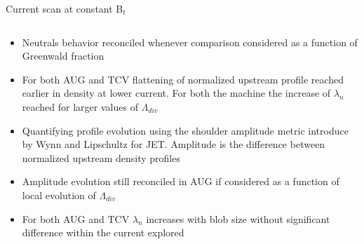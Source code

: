 \documentclass[10pt, compress]{beamer}
\begin{document}
\begin{frame}{Current scan at constant B$_t$}
\begin{columns}
\begin{column}{0.4\textwidth}
\begin{itemize}
          from D$_{\alpha}$ calibrated camera and using electron
          density and temperature from LP data. Neutral density
          increases earlier in edge density at lower current
        \item<5|only@5> Neutrals behavior reconciled whenever
          comparison considered as a function of Greenwald fraction  
        \item<6|only@6> For both AUG and TCV flattening of normalized
          upstream profile reached \alert{earlier in density at lower
            current.} For both the machine the increase of $\lambda_n$
          reached for larger values of $\Lambda_{div}$
        \item<7|only@7> Quantifying profile evolution using the
          \alert{shoulder amplitude metric} introduce by Wynn and
          Lipschultz for JET. \alert{Amplitude is the difference
            between normalized upstream density profiles}
        \item<10|only@10> Amplitude evolution still reconciled in AUG if
          considered as a function of local evolution of $\Lambda_{div}$
        \item<11|only@11> For both AUG and TCV $\lambda_n$ increases
          with blob size without significant difference within the
          current explored
      \end{itemize}
    \end{column}
  \end{columns}
\end{frame}  
\end{document}
